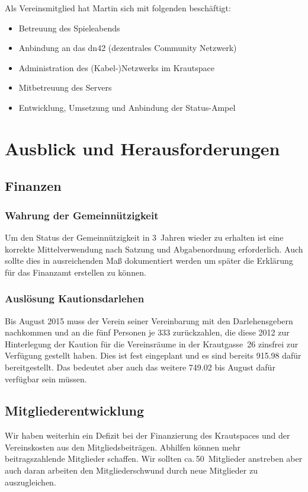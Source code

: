 \documentclass[ngerman,10pt,DIV16]{scrartcl}
\begin{document}
Als Vereinsmitglied hat Martin sich mit folgenden beschäftigt: 
\begin{itemize}
	\item Betreuung des Spieleabends
	\item Anbindung an das dn42 (dezentrales Community Netzwerk)
	\item Administration des (Kabel-)Netzwerks im Krautspace
	\item Mitbetreuung des Servers
	\item Entwicklung, Umsetzung und Anbindung der Status-Ampel
\end{itemize}

\section{Ausblick und Herausforderungen}

\subsection{Finanzen}
\label{sec:ausblick:finanzen}

\subsubsection{Wahrung der Gemeinnützigkeit}
Um den Status der Gemeinnützigkeit in 3~Jahren wieder zu erhalten ist eine korrekte Mittelverwendung nach Satzung und Abgabenordnung erforderlich.
Auch sollte dies in ausreichenden Maß dokumentiert werden um später die Erklärung für das Finanzamt erstellen zu können.

\subsubsection{Auslösung Kautionsdarlehen}
\label{sec:katrionsdarlehen}
Bis August 2015 muss der Verein seiner Vereinbarung mit den Darlehensgebern nachkommen und an die fünf Personen je \SI{333}{\EUR} zurückzahlen, die diese 2012 zur Hinterlegung der Kaution für die Vereinsräume in der Krautgasse~26 zinsfrei zur Verfügung gestellt haben.
Dies ist fest eingeplant und es sind bereits \SI{915,98}{\EUR} dafür bereitgestellt.
Das bedeutet aber auch das weitere \SI{749,02}{\EUR} bis August dafür verfügbar sein müssen.

\subsection{Mitgliederentwicklung}
Wir haben weiterhin ein Defizit bei der Finanzierung des Krautspaces und der Vereinskosten aus den Mitgliedsbeiträgen.
Abhilfen können mehr beitragszahlende Mitglieder schaffen.
Wir sollten ca.\,50~Mitglieder anstreben aber auch daran arbeiten den Mitgliederschwund durch neue Mitglieder zu auszugleichen.
\end{document}
